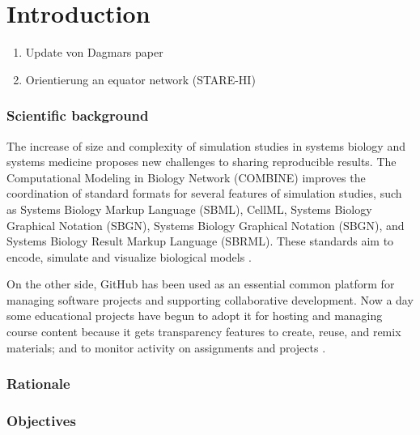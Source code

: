 \section*{Introduction}
\begin{enumerate}
    \item Update von Dagmars paper
    \item Orientierung an equator network (STARE-HI)
\end{enumerate}

\subsubsection*{Scientific background}
The increase of size and complexity of simulation studies in systems biology and systems medicine proposes new challenges to sharing reproducible results. The Computational Modeling in Biology Network (COMBINE) improves the coordination of standard formats for several features of simulation studies, such as Systems Biology Markup Language (SBML), CellML, Systems Biology Graphical Notation (SBGN), Systems Biology Graphical Notation (SBGN), and Systems Biology Result Markup Language (SBRML). These standards aim to encode, simulate and visualize biological models \cite{combine}.

On the other side, GitHub has been used as an essential common platform for managing software projects and supporting collaborative development. Now a day some educational projects have begun to adopt it for hosting and managing course content because it gets transparency features to create, reuse, and remix materials; and to monitor activity on assignments and projects \cite{github}.

\subsubsection*{Rationale}

\subsubsection*{Objectives}
